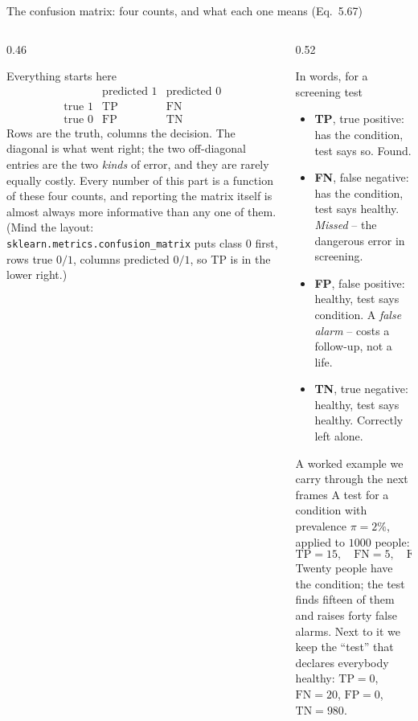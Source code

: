 \documentclass[10pt,aspectratio=169]{beamer}
\begin{document}
\begin{frame}{The confusion matrix: four counts, and what each one means (Eq.~5.67)}
\small
\begin{columns}[T]
\begin{column}{0.46\textwidth}
\begin{block}{Everything starts here}
\scriptsize
\[
  \begin{array}{c|cc}
     & \text{predicted } 1 & \text{predicted } 0\\
    \hline
    \text{true } 1 & \mathrm{TP} & \mathrm{FN}\\
    \text{true } 0 & \mathrm{FP} & \mathrm{TN}
  \end{array}
\]
Rows are the truth, columns the decision.  The diagonal is what went
right; the two off-diagonal entries are the two \emph{kinds} of error, and
they are rarely equally costly.  Every number of this part is a function of
these four counts, and reporting the matrix itself is almost always more
informative than any one of them.  (Mind the layout:
\texttt{sklearn.metrics.confusion\_matrix} puts class $0$ first, rows true
$0/1$, columns predicted $0/1$, so TP is in the lower right.)
\end{block}
\end{column}
\begin{column}{0.52\textwidth}
\begin{block}{In words, for a screening test}
\scriptsize
\begin{itemize}
  \item \textbf{TP}, true positive: has the condition, test says so.  Found.
  \item \textbf{FN}, false negative: has the condition, test says healthy.
        \emph{Missed} -- the dangerous error in screening.
  \item \textbf{FP}, false positive: healthy, test says condition.  A
        \emph{false alarm} -- costs a follow-up, not a life.
  \item \textbf{TN}, true negative: healthy, test says healthy.  Correctly
        left alone.
\end{itemize}
\end{block}
\begin{block}{A worked example we carry through the next frames}
\scriptsize
A test for a condition with prevalence $\pi=2\%$, applied to $1000$
people:
\[
  \mathrm{TP}=15,\quad \mathrm{FN}=5,\quad \mathrm{FP}=40,\quad \mathrm{TN}=940 .
\]
Twenty people have the condition; the test finds fifteen of them and
raises forty false alarms.  Next to it we keep the ``test'' that declares
everybody healthy: $\mathrm{TP}=0$, $\mathrm{FN}=20$, $\mathrm{FP}=0$,
$\mathrm{TN}=980$.
\end{block}
\end{column}
\end{columns}
\end{frame}
\end{document}
